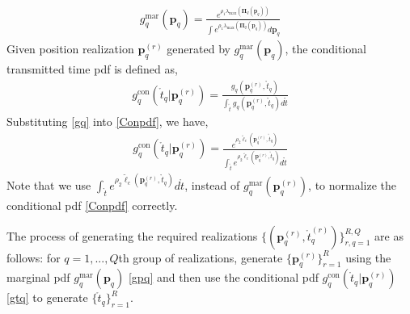 \documentclass[review]{elsarticle}
\begin{document}
\begin{align}\label{gpq}
    g_{q}^{\text{mar}}(\boldsymbol{p}_q)=\frac{e^{\rho_1\lambda_{\text{max}}(\boldsymbol{\Pi}_q(\boldsymbol{p}_q))}}{\int e^{\rho_1\lambda_{\text{max}}(\boldsymbol{\Pi}_q(\boldsymbol{p}_q))} d\boldsymbol{p}_q}
\end{align}
Given position realization $\boldsymbol{p}_q^{(r)}$ generated by $g_{q}^{\text{mar}}(\boldsymbol{p}_q)$, the conditional transmitted time pdf is defined as,
\begin{align}\label{Conpdf}
    g_{q}^{\text{con}}(\mathring{t}_q\vert \boldsymbol{p}_q^{(r)})=\frac{g_q(\boldsymbol{p}_q^{(r)},\mathring{t}_q)}{\int_{\mathring{t}}g_q(\boldsymbol{p}_q^{(r)},\mathring{t}_q)d\mathring{t}}
\end{align}
Substituting \eqref{gq} into \eqref{Conpdf}, we have,
\begin{align}\label{gtq}
    g_{q}^{\text{con}}(\mathring{t}_q\vert \boldsymbol{p}_q^{(r)})=\frac{e^{\rho_2 \tilde{\ell}_c(\boldsymbol{p}^{(r)}_q,\mathring{t}_q)}}{\int_{\mathring{t}}e^{\rho_2 \tilde{\ell}_c(\boldsymbol{p}^{(r)}_q,\mathring{t}_q)}d\mathring{t}}
\end{align}
Note that we use $\int_{\mathring{t}}e^{\rho_2 \tilde{\ell}_c(\boldsymbol{p}^{(r)}_q,\mathring{t}_q)}d\mathring{t}$, instead of $g_{q}^{\text{mar}}(\boldsymbol{p}_q^{(r)})$, to normalize the conditional pdf \eqref{Conpdf} correctly. 

The process of generating the required realizations $\lbrace(\boldsymbol{p}_q^{(r)},\mathring{t}_q^{(r)})\rbrace_{r,q=1}^{R,Q}$ are as follows: for $q=1,...,Q$th group of realizations, generate $\lbrace \boldsymbol{p}_q^{(r)}\rbrace_{r=1}^R$ using the marginal pdf $g_{q}^{\text{mar}}(\boldsymbol{p}_q)$ \eqref{gpq} and then use the conditional pdf $g_{q}^{\text{con}}(\mathring{t}_q\vert \boldsymbol{p}_q^{(r)})$ \eqref{gtq} to generate $\lbrace \mathring{t}_q\rbrace_{r=1}^R$.
\end{document}
